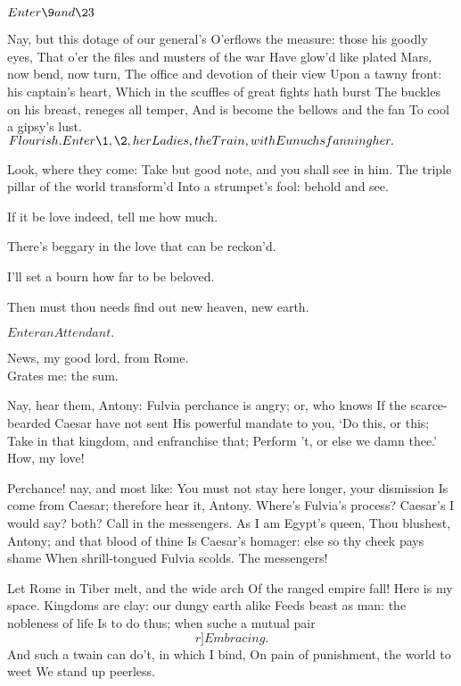 \documentclass{book}
\begin{document}
\thispagestyle{empty}
\pagestyle{MainMatterPage}
\Drama
\Versus
{}

\Act
{}

	\(Enter \9 and \23\)

 Nay, but this dotage of our general's
	O'erflows the measure: those his goodly eyes,
	That o'er the files and musters of the war
   Have glow'd like plated Mars, now bend, now turn, 
	The office and devotion of their view
	Upon a tawny front: his captain's heart, 
	Which in the scuffles of great fights hath burst
	The buckles on his breast, reneges all temper,
	And is become the bellows and the fan 
	To cool a gipsy's lust. \\

	\(Flourish. Enter \1, \2, her Ladies,
	  the Train, with Eunuchs fanning her.\)

		  Look, where they come:
	Take but good note, and you shall see in him. 
	The triple pillar of the world transform'd 
	Into a strumpet's fool: behold and see. 

\2 If it be love indeed, tell me how much.

\1	There's beggary in the love that can be reckon'd.

\2	I'll set a bourn how far to be beloved.

\1	Then must thou needs find out new heaven, new earth.

	\(Enter an Attendant.\)

	News, my good lord, from Rome. \\

\1	Grates me: the sum. 

\2	Nay, hear them, Antony:
	Fulvia perchance is angry; or, who knows
	If the scarce-bearded Caesar have not sent
	His powerful mandate to you, `Do this, or this;
	Take in that kingdom, and enfranchise that;
	Perform 't, or else we damn thee.' \\

\1	How, my love!

\2	Perchance! nay, and most like:
	You must not stay here longer, your dismission
	Is come from Caesar; therefore hear it, Antony.
	Where's Fulvia's process? Caesar's I would say? both?
	Call in the messengers. As I am Egypt's queen,
	Thou blushest, Antony; and that blood of thine
	Is Caesar's homager: else so thy cheek pays shame
	When shrill-tongued Fulvia scolds. The messengers!

\1	Let Rome in Tiber melt, and the wide arch
	Of the ranged empire fall! Here is my space.
	Kingdoms are clay: our dungy earth alike
	Feeds beast as man: the nobleness of life
	Is to do thus; when suche a mutual pair	\[r]Embracing.\]
	And such a twain can do't, in which I bind,
	On pain of punishment, the world to weet
	We stand up peerless. \\
\end{document}
